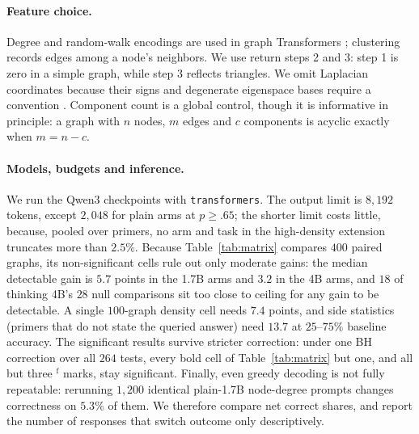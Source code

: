 \documentclass[11pt]{article}
\begin{document}
\paragraph{Feature choice.} Degree and random-walk encodings are used in graph Transformers \citep{rampasek2022recipe}; clustering records edges among a node's neighbors. We use return steps 2 and 3: step 1 is zero in a simple graph, while step 3 reflects triangles. We omit Laplacian coordinates because their signs and degenerate eigenspace bases require a convention \citep{dwivedi2022graph}. Component count is a global control, though it is informative in principle: a graph with $n$ nodes, $m$ edges and $c$ components is acyclic exactly when $m=n-c$.

\paragraph{Models, budgets and inference.} We run the Qwen3 checkpoints with \texttt{transformers}. The output limit is $8{,}192$ tokens, except $2{,}048$ for plain arms at $p\geq.65$; the shorter limit costs little, because, pooled over primers, no arm and task in the high-density extension truncates more than $2.5\%$. %
Because Table~\ref{tab:matrix} compares $400$ paired graphs, its non-significant cells rule out only moderate gains: the median detectable gain is $5.7$ points in the 1.7B arms and $3.2$ in the 4B arms, and $18$ of thinking 4B's $28$ null comparisons sit too close to ceiling for any gain to be detectable. %
A single $100$-graph density cell needs $7.4$ points, and side statistics (primers that do not state the queried answer) need $13.7$ at $25$--$75\%$ baseline accuracy. %
The significant results survive stricter correction: under one BH correction over all $264$ tests, every bold cell of Table~\ref{tab:matrix} but one, and all but three $^{\mathrm{f}}$ marks, stay significant. %
Finally, even greedy decoding is not fully repeatable: rerunning $1{,}200$ identical plain-1.7B node-degree prompts changes correctness on $5.3\%$ of them. We therefore compare net correct shares, and report the number of responses that switch outcome only descriptively. %
\end{document}
